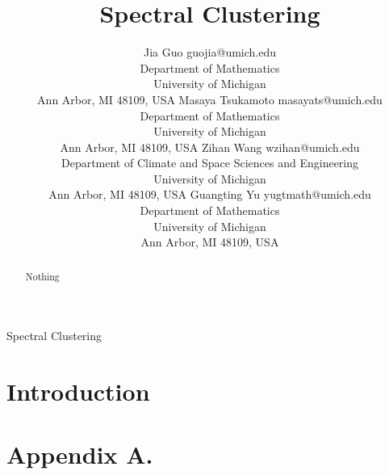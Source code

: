 \documentclass[twoside,11pt]{article}
\begin{document}
\title{Spectral Clustering}

\author{\name Jia Guo \email guojia@umich.edu \\
        \addr Department of Mathematics\\
        University of Michigan\\
        Ann Arbor, MI 48109, USA
        \AND
        \name Masaya Tsukamoto \email masayats@umich.edu \\
        \addr Department of Mathematics\\
        University of Michigan\\
        Ann Arbor, MI 48109, USA
        \AND
        \name Zihan Wang \email wzihan@umich.edu \\
        \addr Department of Climate and Space Sciences and Engineering\\
        University of Michigan\\
        Ann Arbor, MI 48109, USA
        \AND
        \name Guangting Yu \email yugtmath@umich.edu \\
        \addr Department of Mathematics\\
        University of Michigan\\
        Ann Arbor, MI 48109, USA}


\maketitle

\begin{abstract}
Nothing
\end{abstract}

\begin{keywords}
Spectral Clustering
\end{keywords}

\section{Introduction}





\newpage

\appendix
\section*{Appendix A.}
\label{app:theorem}
\end{document}
